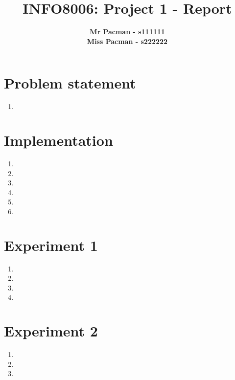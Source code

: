 \documentclass{article}
\begin{document}

\title{\Large{INFO8006: Project 1 - Report}}
\vspace{1cm}
\author{\small{\bf Mr Pacman - s111111} \\ \small{\bf Miss Pacman - s222222}}

\maketitle


\section{Problem statement}

\begin{enumerate}[label=\alph*.]
    \item 
\end{enumerate}

\section{Implementation}

\begin{enumerate}[label=\alph*.]
	\item
    \item 
    \item
    \item
    \item
    \item
\end{enumerate}

\section{Experiment 1}

\begin{enumerate}[label=\alph*.]
    \item 
    \item
    \item
    \item
\end{enumerate}

\section{Experiment 2}

\begin{enumerate}[label=\alph*.]
    \item 
    \item
    \item
\end{enumerate}





\end{document}
